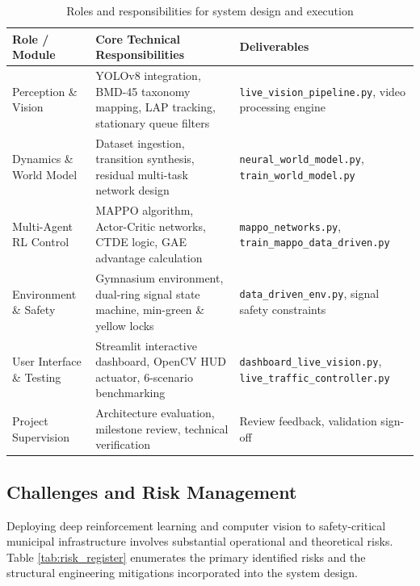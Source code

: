 \documentclass[12pt,a4paper,oneside]{report}
\begin{document}
\begin{table}[htbp]
\centering
\small
\caption{Roles and responsibilities for system design and execution}
\label{tab:roles_responsibilities}
\begin{tabularx}{\textwidth}{|p{3.5cm}|X|p{4.2cm}|}
\hline
\textbf{Role / Module} & \textbf{Core Technical Responsibilities} & \textbf{Deliverables} \\ \hline
Perception \& Vision & YOLOv8 integration, BMD-45 taxonomy mapping, LAP tracking, stationary queue filters & \texttt{live\_vision\_pipeline.py}, video processing engine \\ \hline
Dynamics \& World Model & Dataset ingestion, transition synthesis, residual multi-task network design & \texttt{neural\_world\_model.py}, \texttt{train\_world\_model.py} \\ \hline
Multi-Agent RL Control & MAPPO algorithm, Actor-Critic networks, CTDE logic, GAE advantage calculation & \texttt{mappo\_networks.py}, \texttt{train\_mappo\_data\_driven.py} \\ \hline
Environment \& Safety & Gymnasium environment, dual-ring signal state machine, min-green \& yellow locks & \texttt{data\_driven\_env.py}, signal safety constraints \\ \hline
User Interface \& Testing & Streamlit interactive dashboard, OpenCV HUD actuator, 6-scenario benchmarking & \texttt{dashboard\_live\_vision.py}, \texttt{live\_traffic\_controller.py} \\ \hline
Project Supervision & Architecture evaluation, milestone review, technical verification & Review feedback, validation sign-off \\ \hline
\end{tabularx}
\end{table}

\subsection{Challenges and Risk Management}
Deploying deep reinforcement learning and computer vision to safety-critical municipal infrastructure involves substantial operational and theoretical risks. Table \ref{tab:risk_register} enumerates the primary identified risks and the structural engineering mitigations incorporated into the system design.
\end{document}
